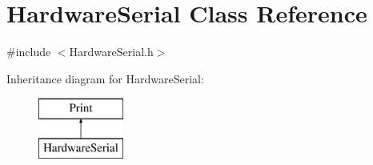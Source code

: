 \hypertarget{classHardwareSerial}{\section{Hardware\-Serial Class Reference}
\label{classHardwareSerial}
}


{\ttfamily \#include $<$Hardware\-Serial.\-h$>$}

Inheritance diagram for Hardware\-Serial\-:\begin{figure}[H]
\begin{center}
\leavevmode
\includegraphics[height=2.000000cm]{classHardwareSerial}
\end{center}
\end{figure}

